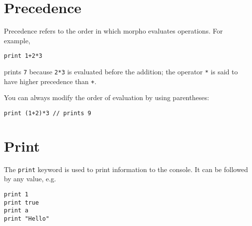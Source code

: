 \hypertarget{precedence}{%
\section{Precedence}\label{precedence}}

Precedence refers to the order in which morpho evaluates operations. For
example,

\begin{lstlisting}
print 1+2*3
\end{lstlisting}

prints \texttt{7} because \texttt{2*3} is evaluated before the addition;
the operator \texttt{*} is said to have higher precedence than
\texttt{+}.

You can always modify the order of evaluation by using parentheses:

\begin{lstlisting}
print (1+2)*3 // prints 9
\end{lstlisting}

\hypertarget{print}{%
\section{Print}\label{print}}

The \texttt{print} keyword is used to print information to the console.
It can be followed by any value, e.g.

\begin{lstlisting}
print 1
print true
print a
print "Hello"
\end{lstlisting}
